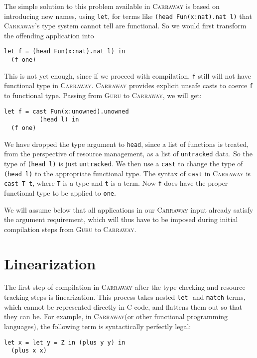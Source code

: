 \documentclass{book}[12pt]
\newcommand{\guru}[0]{\textsc{Guru}\xspace}
\newcommand{\carraway}[0]{\textsc{Carraway}\xspace}
\begin{document}
The simple solution to this problem available in \carraway is based on
introducing new names, using \texttt{let}, for terms like
\texttt{(head Fun(x:nat).nat l)} that \carraway's type system cannot
tell are functional.  So we would first transform the offending
application into

\begin{verbatim}
let f = (head Fun(x:nat).nat l) in
  (f one)
\end{verbatim}

\noindent This is not yet enough, since if we proceed with
compilation, \texttt{f} still will not have functional type in
\carraway.  \carraway provides explicit unsafe casts to coerce
\texttt{f} to functional type.  Passing from \guru to \carraway,
we will get:

\begin{verbatim}
let f = cast Fun(x:unowned).unowned
          (head l) in
  (f one)
\end{verbatim}

\noindent We have dropped the type argument to \texttt{head}, since a
list of functions is treated, from the perspective of resource
management, as a list of \texttt{untracked} data.  So the type of
\texttt{(head l)} is just \texttt{untracked}.  We then use a
\texttt{cast} to change the type of \texttt{(head l)} to the
appropriate functional type.  The syntax of \texttt{cast} in \carraway
is \texttt{cast T t}, where \texttt{T} is a type and \texttt{t} is a
term.  Now \texttt{f} does have the proper functional type to be
applied to \texttt{one}.

We will assume below that all applications in our \carraway input
already satisfy the argument requirement, which will thus have to be
imposed during initial compilation steps from \guru to \carraway.

\section{Linearization}

The first step of compilation in \carraway after the type checking and
resource tracking steps is linearization.  This process takes nested
\texttt{let}- and \texttt{match}-terms, which cannot be represented
directly in C code, and flattens them out so that they can be.  For
example, in \carraway (or other functional programming languages), the
following term is syntactically perfectly legal:

\begin{verbatim}
let x = let y = Z in (plus y y) in
  (plus x x)
\end{verbatim}
\end{document}
